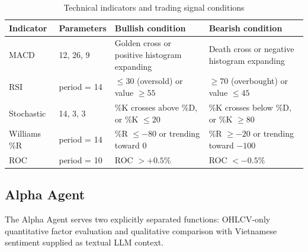 \begin{table}[H]
\centering
\caption{Technical indicators and trading signal conditions}
\label{tab:indicator_conditions}
\renewcommand{\arraystretch}{1.2}

\begin{tabularx}{\textwidth}{|l|l|X|X|}
\hline
\textbf{Indicator} & \textbf{Parameters} & \textbf{Bullish condition} & \textbf{Bearish condition} \\
\hline

MACD & 12, 26, 9 &
Golden cross or positive histogram expanding &
Death cross or negative histogram expanding \\
\hline

RSI & period = 14 &
$\leq 30$ (oversold) or value $\geq 55$ &
$\geq 70$ (overbought) or value $\leq 45$ \\
\hline

Stochastic & 14, 3, 3 &
\%K crosses above \%D, or \%K $\leq 20$ &
\%K crosses below \%D, or \%K $\geq 80$ \\
\hline

Williams \%R & period = 14 &
\%R $\leq -80$ or trending toward 0 &
\%R $\geq -20$ or trending toward $-100$ \\
\hline

ROC & period = 10 &
ROC $> +0.5\%$ &
ROC $< -0.5\%$ \\
\hline

\end{tabularx}
\end{table}

\subsection{Alpha Agent}

The Alpha Agent serves two explicitly separated functions: OHLCV-only quantitative factor evaluation and qualitative comparison with Vietnamese sentiment supplied as textual LLM context.

